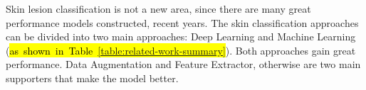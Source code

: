 \documentclass[sensors,article,accept,pdftex,moreauthors]{Definitions/mdpi}
\begin{document}
	
	{Skin lesion classification is not a new area, since there are many great performance models constructed, recent years. The skin classification approaches can be divided into two main approaches: Deep Learning and Machine Learning (\hl{\mbox{as shown in Table \ref{table:related-work-summary}}}). Both approaches gain great performance. Data Augmentation and Feature Extractor, otherwise are two main supporters that make the model better. %
		\begin{table}[H]
\caption{\hl{Summary of related} %
works.}
\label{table:related-work-summary}


\end{table}}
\end{document}
